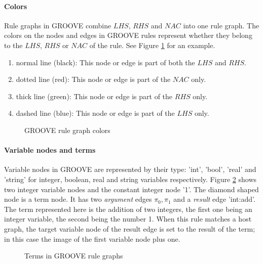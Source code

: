 \paragraph*{Colors}
Rule graphs in GROOVE combine $\mathit{LHS}$, $\mathit{RHS}$ and $\mathit{NAC}$ into one rule graph. The colors on the nodes and edges in GROOVE rules represent whether they belong to the $\mathit{LHS}$, $\mathit{RHS}$ or $\mathit{NAC}$ of the rule. See Figure \ref{fig:colors} for an example.
\begin{enumerate}
  \item normal line (black): This node or edge is part of both the $\mathit{LHS}$ and $\mathit{RHS}$.
  \item dotted line (red): This node or edge is part of the $\mathit{NAC}$ only.
  \item thick line (green): This node or edge is part of the $\mathit{RHS}$ only.
  \item dashed line (blue): This node or edge is part of the $\mathit{LHS}$ only.
\end{enumerate}

\begin{figure}[h]
  \begin{center}
    
  \end{center}
  \caption{GROOVE rule graph colors}
  \label{fig:colors}
\end{figure}

\paragraph*{Variable nodes and terms}
Variable nodes in GROOVE are represented by their type: 'int', 'bool', 'real' and 'string' for integer, boolean, real and string variables respectively. Figure \ref{fig:terms} shows two integer variable nodes and the constant integer node '1'. The diamond shaped node is a term node. It has two \textit{argument} edges $\pi_0, \pi_1$ and a \textit{result} edge 'int:add'. The term represented here is the addition of two integers, the first one being an integer variable, the second being the number 1. When this rule matches a host graph, the target variable node of the result edge is set to the result of the term; in this case the image of the first variable node plus one.

\begin{figure}[h]
  \begin{center}
    
  \end{center}
  \caption{Terms in GROOVE rule graphs}
  \label{fig:terms}
\end{figure}

